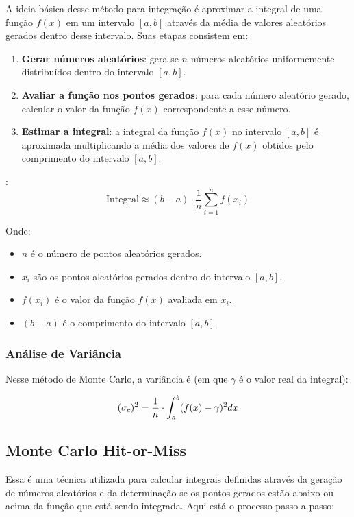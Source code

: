 \documentclass{article}
\begin{document}
A ideia básica desse método para integração é aproximar a integral de uma função $f(x)$ em um intervalo $[a, b]$ através da média de valores aleatórios gerados dentro desse intervalo. Suas etapas consistem em:

\begin{enumerate}
  \item \textbf{Gerar números aleatórios}: gera-se $n$ números aleatórios uniformemente distribuídos dentro do intervalo $[a, b]$.
  
  \item \textbf{Avaliar a função nos pontos gerados}: para cada número aleatório gerado, calcular o valor da função $f(x)$ correspondente a esse número.
  
  \item \textbf{Estimar a integral}: a integral da função $f(x)$ no intervalo $[a, b]$ é aproximada multiplicando a média dos valores de $f(x)$ obtidos pelo comprimento do intervalo $[a, b]$.
\end{enumerate}:
\[
\text{Integral} \approx (b - a) \cdot \frac{1}{n} \sum_{i=1}^{n} f(x_i)
\]

Onde:
\begin{itemize}
  \item $n$ é o número de pontos aleatórios gerados.
  \item $x_i$ são os pontos aleatórios gerados dentro do intervalo $[a, b]$.
  \item $f(x_i)$ é o valor da função $f(x)$ avaliada em $x_i$.
  \item $(b - a)$ é o comprimento do intervalo $[a, b]$.
\end{itemize}

\subsubsection{Análise de Variância}
Nesse método de Monte Carlo, a variância é (em que $\gamma$ é o valor real da integral):

\[
\text(\sigma_{c})^2 = \frac{1}{n}\cdot\int_a^b(f(x) - \gamma)^2dx
\]

\subsection{Monte Carlo Hit-or-Miss}

Essa é uma técnica utilizada para calcular integrais definidas através da geração de números aleatórios e da determinação se os pontos gerados estão abaixo ou acima da função que está sendo integrada. Aqui está o processo passo a passo:
\end{document}
